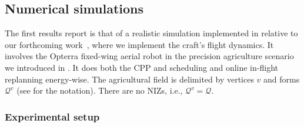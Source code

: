 \subsection{Numerical simulations}
\label{sec:res-num-simu}

The first results report is that of a realistic simulation implemented in \matlab relative to our forthcoming work~\citep{seewald202Xenergy}, where we implement the craft's flight dynamics. It involves the Opterra fixed-wing aerial robot in the precision agriculture scenario we introduced in . It does both the CPP and scheduling and online in-flight replanning energy-wise. The agricultural field is delimited by vertices $v$ and forms $\mathcal{Q}^v$ (see  for the notation). There are no NIZs, i.e., $\mathcal{Q}^v=\mathcal{Q}$.

\subsubsection*{Experimental setup}

